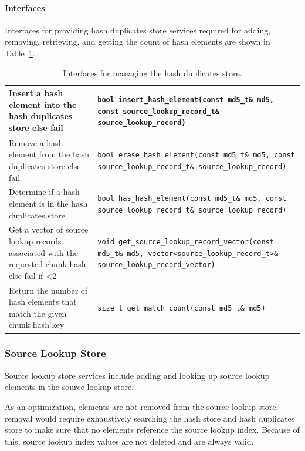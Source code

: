\documentclass[10pt,twoside]{article}
\begin{document}
\paragraph{Interfaces}
Interfaces for providing hash duplicates store services required for 
adding, removing, retrieving, and getting the count of hash elements
are shown in Table~\ref{hash-duplicates-store-interfaces}.

\begin{table}[h]
\center
\begin{tabular}{|p{2in}|p{4in}|}
\hline
Insert a hash element into the hash duplicates store else fail & \texttt{bool insert\_hash\_element(const md5\_t\& md5, const source\_lookup\_record\_t\& source\_lookup\_record)} \\
\hline
Remove a hash element from the hash duplicates store else fail & \texttt{bool erase\_hash\_element(const md5\_t\& md5, const source\_lookup\_record\_t\& source\_lookup\_record)} \\
\hline
Determine if a hash element is in the hash duplicates store & \texttt{bool has\_hash\_element(const md5\_t\& md5, const source\_lookup\_record\_t\& source\_lookup\_record)} \\
\hline
Get a vector of source lookup records associated with the requested chunk hash else fail if \textless 2 & \texttt{void get\_source\_lookup\_record\_vector(const md5\_t\& md5, vector<source\_lookup\_record\_t>\& source\_lookup\_record\_vector)} \\
\hline
Return the number of hash elements that match the given chunk hash key & \texttt{size\_t get\_match\_count(const md5\_t\& md5)} \\
\hline
\end{tabular}
\caption{Interfaces for managing the hash duplicates store.\label{hash-duplicates-store-interfaces}}
\end{table}

\subsubsection{Source Lookup Store}
Source lookup store services include adding
and looking up source lookup elements in the source lookup store.

As an optimization, elements are not removed from the source lookup store;
removal would require exhaustively searching the hash store and hash duplicates store
to make sure that no elements reference the source lookup index.
Because of this, source lookup index values are not deleted
and are always valid.
\end{document}

